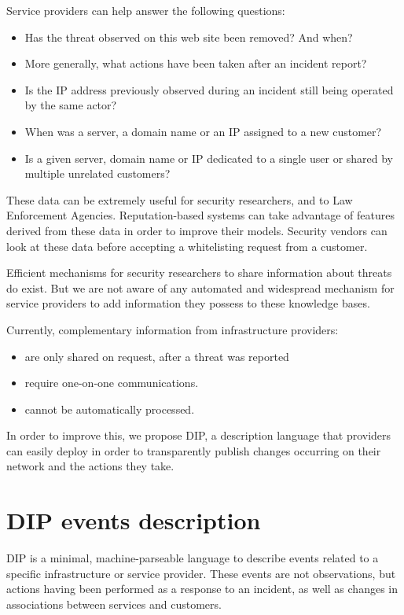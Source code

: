 \documentclass[conference]{IEEEtran}
\begin{document}
Service providers can help answer the following questions:
\begin{itemize}
\item Has the threat observed on this web site been removed? And when?
\item More generally, what actions have been taken after an incident report?
\item Is the IP address previously observed during an incident still being operated by the same actor?
\item When was a server, a domain name or an IP assigned to a new customer?
\item Is a given server, domain name or IP dedicated to a single user or shared by multiple unrelated customers?
\end{itemize}

These data can be extremely useful for security researchers, and to Law Enforcement Agencies.
Reputation-based systems can take advantage of features derived from these data in order to improve their models.
Security vendors can look at these data before accepting a whitelisting request from a customer.

Efficient mechanisms for security researchers to share information about threats do exist. But we are not aware of any automated and widespread mechanism for service providers to add information they possess to these knowledge bases.

Currently, complementary information from infrastructure providers:
\begin{itemize}
\item are only shared on request, after a threat	 was reported
\item require one-on-one communications.
\item cannot be automatically processed.
\end{itemize}

In order to improve this, we propose DIP, a description language that providers can easily deploy in order to transparently publish changes occurring on their network and the actions they take.

\section{DIP events description}

DIP is a minimal, machine-parseable language to describe events related to a specific infrastructure or service provider. These events are not observations, but actions having been performed as a response to an incident, as well as changes in associations between services and customers.
\end{document}
